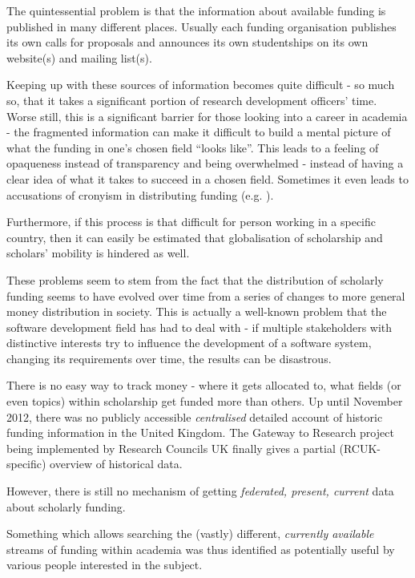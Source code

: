 The quintessential problem is that the information about available funding is published in many different places. Usually each funding organisation publishes its own calls for proposals and announces its own studentships on its own website(s) and mailing list(s).

Keeping up with these sources of information becomes quite difficult - so much so, that it takes a significant portion of research development officers' time. Worse still, this is a significant barrier for those looking into a career in academia - the fragmented information can make it difficult to build a mental picture of what the funding in one's chosen field ``looks like''. This leads to a feeling of opaqueness instead of transparency and being overwhelmed - instead of having a clear idea of what it takes to succeed in a chosen field. Sometimes it even leads to accusations of cronyism in distributing funding (e.g. \cite{cronyism1}).

Furthermore, if this process is that difficult for person working in a specific country, then it can easily be estimated that globalisation of scholarship and scholars' mobility is hindered as well.

These problems seem to stem from the fact that the distribution of scholarly funding seems to have evolved over time from a series of changes to more general money distribution in society. This is actually a well-known problem that the software development field has had to deal with - if multiple stakeholders with distinctive interests try to influence the development of a software system, changing its requirements over time, the results can be disastrous.

There is no easy way to track money - where it gets allocated to, what fields (or even topics) within scholarship get funded more than others. Up until November 2012, there was no publicly accessible \emph{centralised} detailed account of historic funding information in the United Kingdom. The Gateway to Research project being implemented by Research Councils UK finally gives a partial (RCUK-specific) overview of historical data.

However, there is still no mechanism of getting \emph{federated, present, current} data about scholarly funding.

Something which allows searching the (vastly) different, \emph{currently available} streams of funding within academia was thus identified as potentially useful by various people interested in the subject.

